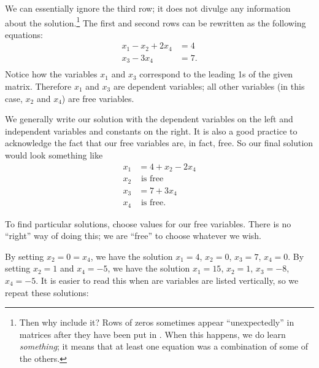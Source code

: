 {We can essentially ignore the third row; it does not divulge any information about the solution.\footnote{Then why include it? Rows of zeros sometimes appear ``unexpectedly'' in matrices after they have been put in \rref. When this happens, we do learn \textit{something}; it means that at least one equation was a combination of some of the others.} 
 The first and second rows can be rewritten as the following equations: \begin{align*} x_1 - x_2 + 2x_4 &=4 \\ x_3 - 3x_4 &= 7. \\ \end{align*} Notice how the variables $x_1$ and $x_3$ correspond to the leading 1s of the given matrix. Therefore $x_1$ and $x_3$ are dependent variables; all other variables (in this case, $x_2$ and $x_4$) are free variables.

We generally write our solution with the dependent variables on the left and independent variables and constants on the right. It is also a good practice to acknowledge the fact that our free variables are, in fact, free. So our final solution would look something like \begin{align*} x_1 &= 4 +x_2 - 2x_4 \\ x_2 & \text{ is free} \\ x_3 &= 7+3x_4 \\ x_4 & \text{ is free}.\end{align*}

To find particular solutions, choose values for our free variables. There is no ``right'' way of doing this; we are ``free'' to choose whatever we wish. 


By setting $x_2 = 0 = x_4$, we have the solution $x_1 = 4$, $x_2 = 0$, $x_3 = 7$, $x_4 = 0$. By setting $x_2 = 1$ and $x_4 = -5$, we have the solution $x_1 = 15$, $x_2 = 1$, $x_3 = -8$, $x_4 = -5$. It is easier to read this when are variables are listed vertically, so we repeat these solutions:
\medskip

}

